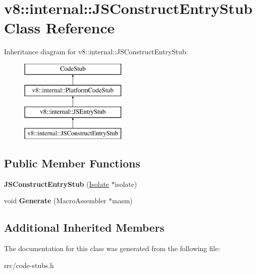 \hypertarget{classv8_1_1internal_1_1_j_s_construct_entry_stub}{}\section{v8\+:\+:internal\+:\+:J\+S\+Construct\+Entry\+Stub Class Reference}
\label{classv8_1_1internal_1_1_j_s_construct_entry_stub}
Inheritance diagram for v8\+:\+:internal\+:\+:J\+S\+Construct\+Entry\+Stub\+:\begin{figure}[H]
\begin{center}
\leavevmode
\includegraphics[height=4.000000cm]{classv8_1_1internal_1_1_j_s_construct_entry_stub}
\end{center}
\end{figure}
\subsection*{Public Member Functions}
\begin{DoxyCompactItemize}
\item 
\hypertarget{classv8_1_1internal_1_1_j_s_construct_entry_stub_a2f0b4d4e393928d6e91a8fbde140562c}{}{\bfseries J\+S\+Construct\+Entry\+Stub} (\hyperlink{classv8_1_1internal_1_1_isolate}{Isolate} $\ast$isolate)\label{classv8_1_1internal_1_1_j_s_construct_entry_stub_a2f0b4d4e393928d6e91a8fbde140562c}

\item 
\hypertarget{classv8_1_1internal_1_1_j_s_construct_entry_stub_a97bb3d00c6cc1f5705ce7a187e30e2f8}{}void {\bfseries Generate} (Macro\+Assembler $\ast$masm)\label{classv8_1_1internal_1_1_j_s_construct_entry_stub_a97bb3d00c6cc1f5705ce7a187e30e2f8}

\end{DoxyCompactItemize}
\subsection*{Additional Inherited Members}


The documentation for this class was generated from the following file\+:\begin{DoxyCompactItemize}
\item 
src/code-\/stubs.\+h\end{DoxyCompactItemize}
